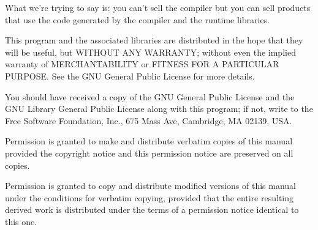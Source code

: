 \documentclass[\fmtsize,a4paper,twoside]{report}
\def\myparskip{8pt}
\begin{document}
What we're trying to say is: you can't sell the compiler but you can
sell products that use the code generated by the compiler and the
runtime libraries.

This program and the associated libraries are distributed in the hope
that they will be useful, but WITHOUT ANY WARRANTY; without even the
implied warranty of MERCHANTABILITY or FITNESS FOR A PARTICULAR
PURPOSE\@.  See the GNU General Public License for more details.

You should have received a copy of the GNU General Public License and
the GNU Library General Public License along with this program; if
not, write to the Free Software Foundation, Inc., 675 Mass Ave,
Cambridge, MA 02139, USA\@.

Permission is granted to make and distribute verbatim copies of
this manual provided the copyright notice and this permission notice
are preserved on all copies.

Permission is granted to copy and distribute modified versions of this
manual under the conditions for verbatim copying, provided that the
entire resulting derived work is distributed under the terms of a
permission notice identical to this one.

\tableofcontents

\listoffigures
























\appendix








\end{document}
